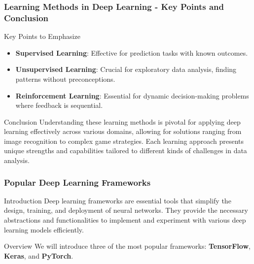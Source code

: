 \documentclass[aspectratio=169]{beamer}
\begin{document}
\begin{frame}[fragile]
    \frametitle{Learning Methods in Deep Learning - Key Points and Conclusion}
    \begin{block}{Key Points to Emphasize}
        \begin{itemize}
            \item \textbf{Supervised Learning}: Effective for prediction tasks with known outcomes.
            \item \textbf{Unsupervised Learning}: Crucial for exploratory data analysis, finding patterns without preconceptions.
            \item \textbf{Reinforcement Learning}: Essential for dynamic decision-making problems where feedback is sequential.
        \end{itemize}
    \end{block}

    \begin{block}{Conclusion}
        Understanding these learning methods is pivotal for applying deep learning effectively across various domains, allowing for solutions ranging from image recognition to complex game strategies. Each learning approach presents unique strengths and capabilities tailored to different kinds of challenges in data analysis.
    \end{block}
\end{frame}

\begin{frame}
  \frametitle{Popular Deep Learning Frameworks}
  \begin{block}{Introduction}
    Deep learning frameworks are essential tools that simplify the design, training, and deployment of neural networks. They provide the necessary abstractions and functionalities to implement and experiment with various deep learning models efficiently.
  \end{block}
  
  \begin{block}{Overview}
    We will introduce three of the most popular frameworks: \textbf{TensorFlow}, \textbf{Keras}, and \textbf{PyTorch}.
  \end{block}
\end{frame}
\end{document}
